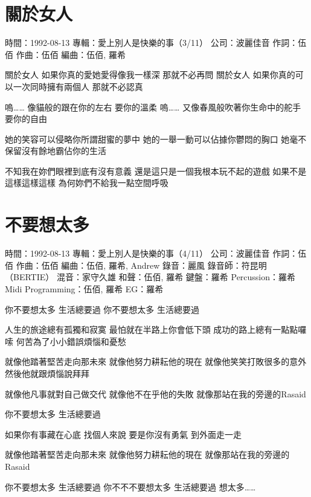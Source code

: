 \documentclass[UTF8,a4paper,oneside,twocolumn,12pt]{ctexbook}
\newcommand{\infopair}[2]{\textbullet #1：#2}
\newcommand{\zc}[1][伍佰]{\infopair{作詞}{#1}}
\newcommand{\zq}[1][伍佰]{\infopair{作曲}{#1}}
\newcommand{\bq}[1][伍佰]{\infopair{編曲}{#1}}
\newcommand{\zj}[1]{\infopair{專輯}{#1}}
\newcommand{\sj}[1]{\infopair{時間}{#1}}
\newcommand{\gs}[1]{\infopair{公司}{#1}}
\newenvironment{info}{\begin{flushleft}\kaishu
	}
	{\end{flushleft}\normalsize\yahei\par}
\newenvironment{lyric}{
	}
{}
\begin{document}
\section{關於女人}
\begin{info}
	\sj{1992-08-13}
	\zj{愛上別人是快樂的事（3/11）}
	\gs{波麗佳音}
	\zc
	\zq
	\bq[伍佰, 羅希]
\end{info}
\begin{lyric}
	關於女人
	如果你真的愛她愛得像我一樣深
	那就不必再問
	關於女人
	如果你真的可以一次同時擁有兩個人
	那就不必認真

	嗚……
	像貓般的跟在你的左右
	要你的溫柔
	嗚……
	又像春風般吹著你生命中的舵手
	要你的自由

	她的笑容可以侵略你所謂甜蜜的夢中
	她的一舉一動可以佔據你鬱悶的胸口
	她毫不保留沒有餘地霸佔你的生活

	不知我在妳們眼裡到底有沒有意義
	還是這只是一個我根本玩不起的遊戲
	如果不是這樣這樣這樣 為何妳們不給我一點空間呼吸
\end{lyric}

\section{不要想太多}
\begin{info}
	\sj{1992-08-13}
	\zj{愛上別人是快樂的事（4/11）}
	\gs{波麗佳音}
	\zc
	\zq
	\bq[伍佰, 羅希, Andrew]
	\infopair{錄音}{麗風}
	\infopair{錄音師}{符昆明（BERTIE）}
	\infopair{混音}{家守久雄}
	\infopair{和聲}{伍佰, 羅希}
	\infopair{鍵盤}{羅希}
	\infopair{Percussion}{羅希}
	\infopair{Midi Programming}{伍佰, 羅希}
	\infopair{EG}{羅希}
\end{info}
\begin{lyric}
	你不要想太多  生活總要過
	你不要想太多  生活總要過

	人生的旅途總有孤獨和寂寞
	最怕就在半路上你會低下頭
	成功的路上總有一點點囉嗦
	何苦為了小小錯誤煩惱和憂愁

	就像他踏著堅苦走向那未來
	就像他努力耕耘他的現在
	就像他笑笑打敗很多的意外
	然後他就跟煩惱說拜拜

	就像他凡事就對自己做交代
	就像他不在乎他的失敗
	就像那站在我的旁邊的Rasaid

	你不要想太多  生活總要過

	如果你有事藏在心底  找個人來說
	要是你沒有勇氣  到外面走一走

	就像他踏著堅苦走向那未來
	就像他努力耕耘他的現在
	就像那站在我的旁邊的Rasaid

	你不要想太多  生活總要過
	你不不不要想太多  生活總要過
	想太多……
\end{lyric}
\end{document}
